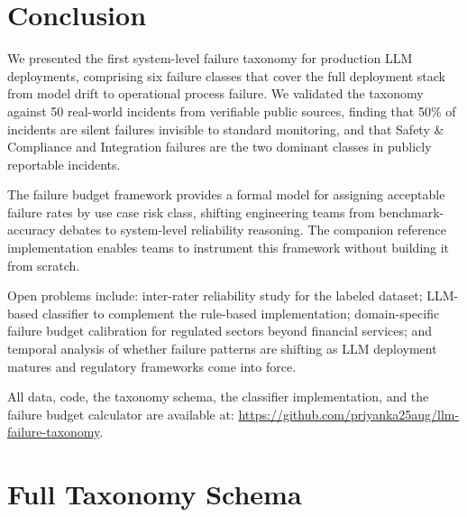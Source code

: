 \documentclass{article}
\begin{document}
\section{Conclusion}
\label{sec:conclusion}

We presented the first system-level failure taxonomy for production LLM
deployments, comprising six failure classes that cover the full deployment
stack from model drift to operational process failure.  We validated the
taxonomy against 50 real-world incidents from verifiable public sources,
finding that 50\% of incidents are silent failures invisible to standard
monitoring, and that Safety \& Compliance and Integration failures are the
two dominant classes in publicly reportable incidents.

The failure budget framework provides a formal model for assigning acceptable
failure rates by use case risk class, shifting engineering teams from
benchmark-accuracy debates to system-level reliability reasoning.  The
companion reference implementation enables teams to instrument this framework
without building it from scratch.

Open problems include: inter-rater reliability study for the labeled dataset;
LLM-based classifier to complement the rule-based implementation; domain-specific
failure budget calibration for regulated sectors beyond financial services;
and temporal analysis of whether failure patterns are shifting as LLM deployment
matures and regulatory frameworks come into force.

All data, code, the taxonomy schema, the classifier implementation, and the
failure budget calculator are available at:
\url{https://github.com/priyanka25aug/llm-failure-taxonomy}.




\appendix

\section{Full Taxonomy Schema}
\label{appendix:schema}
\end{document}
